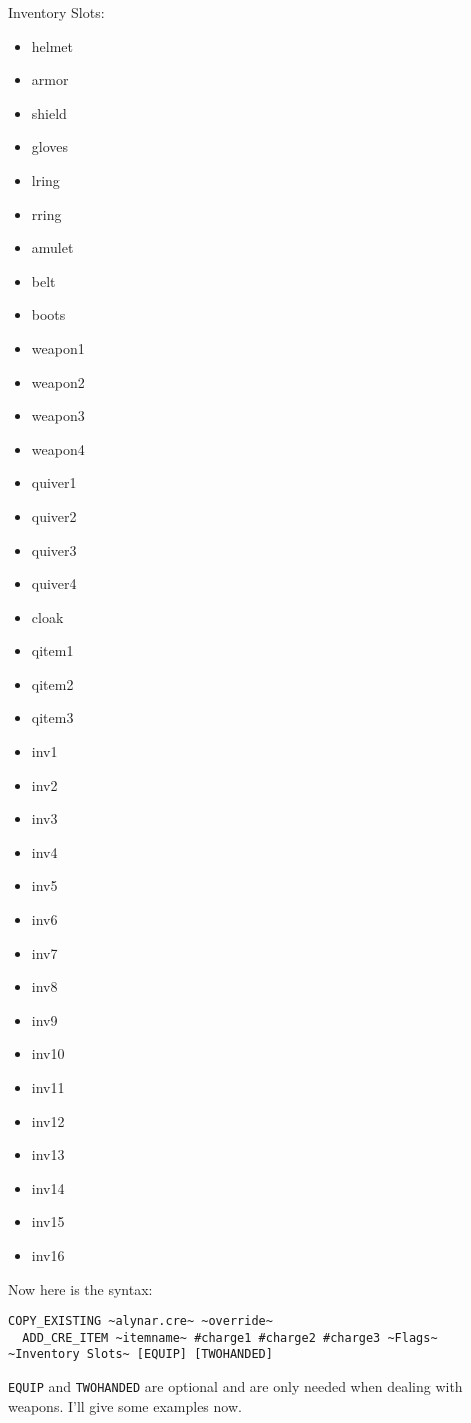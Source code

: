 \documentclass{article}
\def\t#1{{\tt #1}}
\begin{document}
Inventory Slots:
\begin{itemize}
\item helmet
\item armor
\item shield
\item gloves
\item lring
\item rring
\item amulet
\item belt
\item boots
\item weapon1
\item weapon2
\item weapon3
\item weapon4
\item quiver1
\item quiver2
\item quiver3
\item quiver4
\item cloak
\item qitem1
\item qitem2
\item qitem3
\item inv1
\item inv2
\item inv3
\item inv4
\item inv5
\item inv6
\item inv7
\item inv8
\item inv9
\item inv10
\item inv11
\item inv12
\item inv13
\item inv14
\item inv15
\item inv16
\end{itemize}

Now here is the syntax:

\begin{verbatim}
COPY_EXISTING ~alynar.cre~ ~override~
  ADD_CRE_ITEM ~itemname~ #charge1 #charge2 #charge3 ~Flags~ ~Inventory Slots~ [EQUIP] [TWOHANDED]
\end{verbatim}

\t{EQUIP} and \t{TWOHANDED} are optional and are only needed when dealing
with weapons.  I'll give some examples now.
\end{document}
